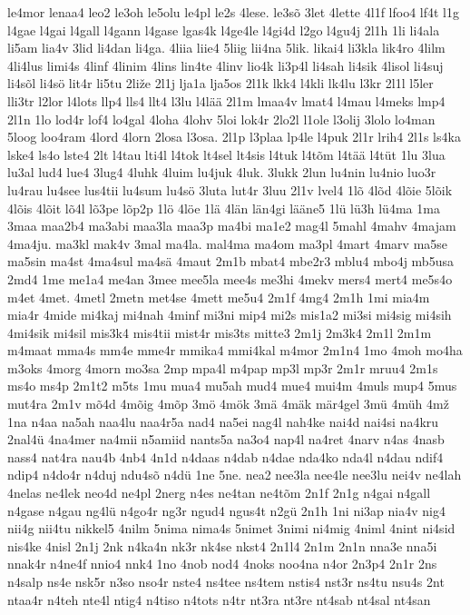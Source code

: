 {le4mor
lenaa4
leo2
le3oh
le5olu
le4pl
le2s
4lese.
le3sõ
3let
4lette
4l1f
lfoo4
lf4t
l1g
l4gae
l4gai
l4gall
l4gann
l4gase
lgas4k
l4ge4le
l4gi4d
l2go
l4gu4j
2l1h
1li
li4ala
li5am
lia4v
3lid
li4dan
li4ga.
4liia
liie4
5liig
lii4na
5lik.
likai4
li3kla
lik4ro
4lilm
4li4lus
limi4s
4linf
4linim
4lins
lin4te
4linv
lio4k
li3p4l
li4sah
li4sik
4lisol
li4suj
li4sõl
li4sö
lit4r
li5tu
2liže
2l1j
lja1a
lja5os
2l1k
lkk4
l4kli
lk4lu
l3kr
2l1l
l5ler
lli3tr
l2lor
l4lots
llp4
lls4
llt4
l3lu
l4lää
2l1m
lmaa4v
lmat4
l4mau
l4meks
lmp4
2l1n
1lo
lod4r
lof4
lo4gal
4loha
4lohv
5loi
lok4r
2lo2l
l1ole
l3olij
3lolo
lo4man
5loog
loo4ram
4lord
4lorn
2losa
l3osa.
2l1p
l3plaa
lp4le
l4puk
2l1r
lrih4
2l1s
ls4ka
lske4
ls4o
lste4
2lt
l4tau
lti4l
l4tok
lt4sel
lt4sis
l4tuk
l4tõm
l4tää
l4tüt
1lu
3lua
lu3al
lud4
lue4
3lug4
4luhk
4luim
lu4juk
4luk.
3lukk
2lun
lu4nin
lu4nio
luo3r
lu4rau
lu4see
lus4tii
lu4sum
lu4sö
3luta
lut4r
3luu
2l1v
lvel4
1lõ
4lõd
4lõie
5lõik
4lõis
4lõit
lõ4l
lõ3pe
lõp2p
1lö
4löe
1lä
4län
län4gi
lääne5
1lü
lü3h
lü4ma
1ma
3maa
maa2b4
ma3abi
maa3la
maa3p
ma4bi
ma1e2
mag4l
5mahl
4mahv
4majam
4ma4ju.
ma3kl
mak4v
3mal
ma4la.
mal4ma
ma4om
ma3pl
4mart
4marv
ma5se
ma5sin
ma4st
4ma4sul
ma4sä
4maut
2m1b
mbat4
mbe2r3
mblu4
mbo4j
mb5usa
2md4
1me
me1a4
me4an
3mee
mee5la
mee4s
me3hi
4mekv
mers4
mert4
me5s4o
m4et
4met.
4metl
2metn
met4se
4mett
me5u4
2m1f
4mg4
2m1h
1mi
mia4m
mia4r
4mide
mi4kaj
mi4nah
4minf
mi3ni
mip4
mi2s
mis1a2
mi3si
mi4sig
mi4sih
4mi4sik
mi4sil
mis3k4
mis4tii
mist4r
mis3ts
mitte3
2m1j
2m3k4
2m1l
2m1m
m4maat
mma4s
mm4e
mme4r
mmika4
mmi4kal
m4mor
2m1n4
1mo
4moh
mo4ha
m3oks
4morg
4morn
mo3sa
2mp
mpa4l
m4pap
mp3l
mp3r
2m1r
mruu4
2m1s
ms4o
ms4p
2m1t2
m5ts
1mu
mua4
mu5ah
mud4
mue4
mui4m
4muls
mup4
5mus
mut4ra
2m1v
mõ4d
4mõig
4mõp
3mö
4mök
3mä
4mäk
mär4gel
3mü
4müh
4mž
1na
n4aa
na5ah
naa4lu
naa4r5a
nad4
na5ei
nag4l
nah4ke
nai4d
nai4si
na4kru
2nal4ü
4na4mer
na4mii
n5amiid
nants5a
na3o4
nap4l
na4ret
4narv
n4as
4nasb
nass4
nat4ra
nau4b
4nb4
4n1d
n4daas
n4dab
n4dae
nda4ko
nda4l
n4dau
ndif4
ndip4
n4do4r
n4duj
ndu4sõ
n4dü
1ne
5ne.
nea2
nee3la
nee4le
nee3lu
nei4v
ne4lah
4nelas
ne4lek
neo4d
ne4pl
2nerg
n4es
ne4tan
ne4tõm
2n1f
2n1g
n4gai
n4gall
n4gase
n4gau
ng4lü
n4go4r
ng3r
ngud4
ngus4t
n2gü
2n1h
1ni
ni3ap
nia4v
nig4
nii4g
nii4tu
nikkel5
4nilm
5nima
nima4s
5nimet
3nimi
ni4mig
4niml
4nint
ni4sid
nis4ke
4nisl
2n1j
2nk
n4ka4n
nk3r
nk4se
nkst4
2n1l4
2n1m
2n1n
nna3e
nna5i
nnak4r
n4ne4f
nnio4
nnk4
1no
4nob
nod4
4noks
noo4na
n4or
2n3p4
2n1r
2ns
n4salp
ns4e
nsk5r
n3so
nso4r
nste4
ns4tee
ns4tem
nstis4
nst3r
ns4tu
nsu4s
2nt
ntaa4r
n4teh
nte4l
ntig4
n4tiso
n4tots
n4tr
nt3ra
nt3re
nt4sab
nt4sal
nt4san
}
